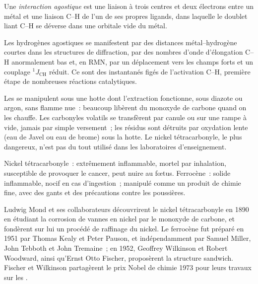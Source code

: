 \begin{definition}\label{def:b3:organometallic-bonding:agostic}
Une \emph{interaction agostique} est une liaison
à trois centres et deux électrons entre un métal et une liaison C--H de l'un
de ses propres ligands, dans laquelle le doublet liant C--H se déverse dans
une orbitale vide du métal.
\end{definition}

Les hydrogènes agostiques se manifestent par des distances métal--hydrogène
courtes dans les structures de diffraction, par des nombres d'onde
d'élongation C--H anormalement bas et, en RMN, par un déplacement vers les
champs forts et un couplage $^1J_{\mathrm{CH}}$ réduit. Ce sont des instantanés figés de
l'activation C--H, première étape de nombreuses réactions catalytiques.

\begin{inthelab}
Les  se manipulent sous une hotte dont l'extraction
fonctionne, sous diazote ou argon, sans flamme nue~: beaucoup libèrent du
monoxyde de carbone quand on les chauffe. Les carbonyles volatils se
transfèrent par canule ou sur une rampe à vide, jamais par simple
versement~; les résidus sont détruits par oxydation lente (eau de Javel ou
eau de brome) sous la hotte. Le nickel tétracarbonyle, le plus dangereux,
n'est pas du tout utilisé dans les laboratoires d'enseignement.
\end{inthelab}

\begin{safety}{}
Nickel tétracarbonyle~: extrêmement inflammable, mortel par inhalation,
susceptible de provoquer le cancer, peut nuire au fœtus. Ferrocène~: solide
inflammable, nocif en cas d'ingestion~; manipulé comme un produit de chimie
fine, avec des gants et des précautions contre les poussières.
\end{safety}

\begin{history}
Ludwig Mond et ses collaborateurs découvrirent le nickel tétracarbonyle en
1890 en étudiant la corrosion de vannes en nickel par le monoxyde de
carbone, et fondèrent sur lui un procédé de raffinage du nickel. Le
ferrocène fut préparé en 1951 par Thomas Kealy et Peter Pauson, et
indépendamment par Samuel Miller, John Tebboth et John Tremaine~; en 1952,
Geoffrey Wilkinson et Robert Woodward, ainsi qu'Ernst Otto Fischer,
proposèrent la structure sandwich. Fischer et Wilkinson partagèrent le prix
Nobel de chimie 1973 pour leurs travaux sur les .
\end{history}

